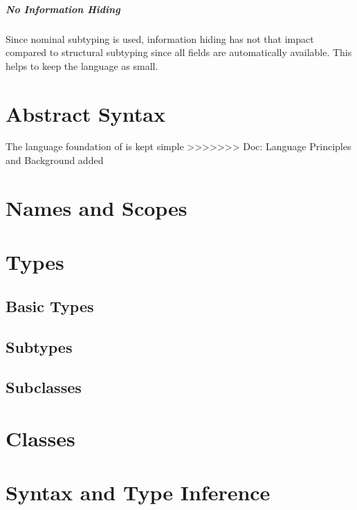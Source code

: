 \paragraph{No Information Hiding}
Since nominal subtyping is used, information hiding has not that impact
compared to structural subtyping since all fields are automatically
available. This helps to keep the language as small.

\chapter{Abstract Syntax}
The language foundation of \ooplss is kept simple
>>>>>>> Doc: Language Principles and Background added

\chapter{Names and Scopes}

\chapter{Types}
\section{Basic Types}
\section{Subtypes}
\section{Subclasses}

\chapter{Classes}

\chapter{Syntax and Type Inference}
